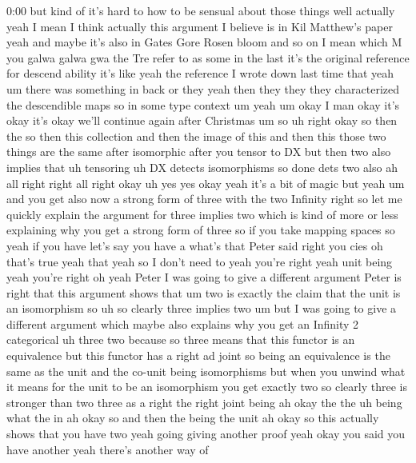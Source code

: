 \begin{unfinished}{0:00}
but  kind  of  it's  hard
to  how  to  be  sensual  about  those  things
well  actually  yeah  I  mean  I  think
actually  this  argument  I  believe  is  in
Kil  Matthew's  paper
yeah  and  maybe  it's  also  in  Gates  Gore
Rosen  bloom  and  so  on  I  mean  which  M  you
galwa
galwa
gwa  the  Tre  refer  to  as  some  in  the  last
it's  the  original  reference  for  descend
ability  it's  like  yeah  the  reference  I
wrote  down  last  time
that
yeah  um  there  was  something  in  back  or
they  yeah  then  they  they  they
characterized  the  descendible  maps  so  in
some  type  context  um
yeah  um  okay  I  man  okay  it's  okay  it's
okay  we'll  continue  again  after
Christmas  um  so  uh  right  okay  so  then
the  so  then  this  collection  and  then  the
image  of  this  and  then  this  those  two
things  are  the  same  after  isomorphic
after  you  tensor  to  DX  but  then  two  also
implies  that
uh
tensoring  uh  DX  detects
isomorphisms  so
done
dets
two
also  ah  all  right  right  all  right
okay  uh  yes  yes
okay
yeah  it's  a  bit  of  magic  but
yeah  um  and  you  get  also  now  a  strong
form  of  three  with  the  two  Infinity
right  so  let  me  quickly  explain  the
argument  for  three  implies  two  which  is
kind  of  more  or  less  explaining  why  you
get  a  strong  form  of  three  so  if  you
take  mapping  spaces  so  yeah  if  you  have
let's  say  you  have  a  what's  that
Peter
said
right  you  cies  oh  that's  true  yeah  that
yeah  so  I  don't  need  to  yeah  you're
right  yeah  unit  being  yeah  you're  right
oh  yeah  Peter  I  was  going  to  give  a
different  argument  Peter  is  right  that
this  argument  shows  that  um  two  is
exactly  the  claim  that  the  unit  is  an
isomorphism  so  uh  so  clearly  three
implies  two  um  but  I  was  going  to  give  a
different  argument  which  maybe  also
explains  why  you  get  an  Infinity  2
categorical
uh
three  two
because  so  three  means  that  this  functor
is  an  equivalence  but  this  functor  has  a
right  ad  joint  so  being  an  equivalence
is  the  same  as  the  unit  and  the  co-unit
being  isomorphisms  but  when  you  unwind
what  it  means  for  the  unit  to  be  an
isomorphism  you  get  exactly  two  so
clearly  three  is  stronger  than  two  three
as  a  right  the  right  joint  being  ah  okay
the
the  uh
being
what  the  in  ah
okay  so  and  then  the  being  the
unit  ah  okay  so  this  actually  shows  that
you  have  two  yeah  going  giving  another
proof  yeah  okay  you  said  you  have
another  yeah  there's  another  way  of

\end{unfinished}
